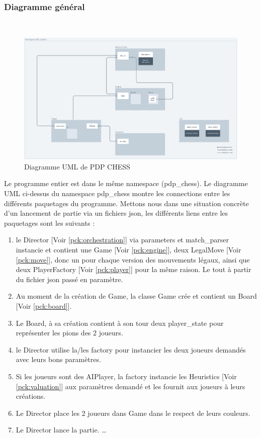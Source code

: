 \documentclass{article}
\begin{document}
\subsubsection{Diagramme général}
~~\\
\newline
\begin{figure}[!h]
    \centering
    \includegraphics[scale = 0.35]{img/Package/UML.png}
    \caption{Diagramme UML de PDP CHESS}
    \label{uml}
\end{figure}
\newline 
Le programme entier est dans le même namespace (pdp\_chess).
Le diagramme UML ci-dessus du namespace pdp\_chess montre les connections entre les différents paquetages du programme.
Mettons nous dans une situation concrète d'un lancement de partie via un fichiers json, les différents liens entre les paquetages sont les suivants :
\begin{enumerate}
    \item le Director [Voir \ref{pck:orchestration}] via parameters et match\_parser instancie et contient une Game [Voir \ref{pck:engine}], deux LegalMove [Voir \ref{pck:move}], donc un pour chaque version des mouvements légaux, ainsi que deux PlayerFactory [Voir \ref{pck:player}] pour la même raison. Le tout à partir du fichier json passé en paramètre.
    \item Au moment de la création de Game, la classe Game crée et contient un Board [Voir \ref{pck:board}].
    \item Le Board, à sa création contient à son tour deux player\_state pour représenter les pions des 2 joueurs.
    \item le Director utilise la/les factory pour instancier les deux joueurs demandés avec leurs bons paramètres.
    \item Si les joueurs sont des AIPlayer, la factory instancie les Heuristics [Voir \ref{pck:valuation}] aux paramètres demandé et les fournit aux joueurs à leurs créations.
    \item Le Director place les 2 joueurs dans Game dans le respect de leurs couleurs.
    \item Le Director lance la partie. \dots
\end{enumerate}
\end{document}
